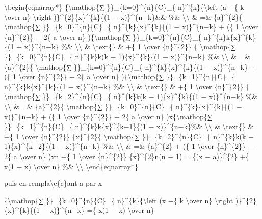 \documentclass[]{article}
\begin{document}
\textbackslash{}begin\{eqnarray*\} \{\textbackslash{}mathop\{∑
\}\}\_\{k=0\}\^{}\{n\}\{C\}\_\{ n\}\^{}\{k\}\{\textbackslash{}left (a
−\{ k \textbackslash{}over n\} \textbackslash{}right
)\}\^{}\{2\}\{x\}\^{}\{k\}\{(1 − x)\}\^{}\{n−k\}\&\& \%\&
\textbackslash{}\textbackslash{} \& =\& \{a\}\^{}\{2\}\{
\textbackslash{}mathop\{∑ \}\}\_\{k=0\}\^{}\{n\}\{C\}\_\{
n\}\^{}\{k\}\{x\}\^{}\{k\}\{(1 − x)\}\^{}\{n−k\} + (\{ 1
\textbackslash{}over \{n\}\^{}\{2\}\} − 2\{ a \textbackslash{}over n\}
)\{\textbackslash{}mathop\{∑ \}\}\_\{k=0\}\^{}\{n\}\{C\}\_\{
n\}\^{}\{k\}k\{x\}\^{}\{k\}\{(1 − x)\}\^{}\{n−k\} \%\&
\textbackslash{}\textbackslash{} \& \textbackslash{}text\{\} \& +\{ 1
\textbackslash{}over \{n\}\^{}\{2\}\} \{ \textbackslash{}mathop\{∑
\}\}\_\{k=0\}\^{}\{n\}\{C\}\_\{ n\}\^{}\{k\}k(k − 1)\{x\}\^{}\{k\}\{(1 −
x)\}\^{}\{n−k\} \%\& \textbackslash{}\textbackslash{} \& =\&
\{a\}\^{}\{2\}\{ \textbackslash{}mathop\{∑
\}\}\_\{k=0\}\^{}\{n\}\{C\}\_\{ n\}\^{}\{k\}\{x\}\^{}\{k\}\{(1 −
x)\}\^{}\{n−k\} + (\{ 1 \textbackslash{}over \{n\}\^{}\{2\}\} − 2\{ a
\textbackslash{}over n\} )\{\textbackslash{}mathop\{∑
\}\}\_\{k=1\}\^{}\{n\}\{C\}\_\{ n\}\^{}\{k\}k\{x\}\^{}\{k\}\{(1 −
x)\}\^{}\{n−k\} \%\& \textbackslash{}\textbackslash{} \&
\textbackslash{}text\{\} \& +\{ 1 \textbackslash{}over \{n\}\^{}\{2\}\}
\{ \textbackslash{}mathop\{∑ \}\}\_\{k=2\}\^{}\{n\}\{C\}\_\{
n\}\^{}\{k\}k(k − 1)\{x\}\^{}\{k\}\{(1 − x)\}\^{}\{n−k\} \%\&
\textbackslash{}\textbackslash{} \& =\& \{a\}\^{}\{2\}\{
\textbackslash{}mathop\{∑ \}\}\_\{k=0\}\^{}\{n\}\{C\}\_\{
n\}\^{}\{k\}\{x\}\^{}\{k\}\{(1 − x)\}\^{}\{n−k\} + (\{ 1
\textbackslash{}over \{n\}\^{}\{2\}\} − 2\{ a \textbackslash{}over n\}
)x\{\textbackslash{}mathop\{∑ \}\}\_\{k=1\}\^{}\{n\}\{C\}\_\{
n\}\^{}\{k\}k\{x\}\^{}\{k−1\}\{(1 − x)\}\^{}\{n−k\}\%\&
\textbackslash{}\textbackslash{} \& \textbackslash{}text\{\} \& +\{ 1
\textbackslash{}over \{n\}\^{}\{2\}\} \{x\}\^{}\{2\}\{
\textbackslash{}mathop\{∑ \}\}\_\{k=2\}\^{}\{n\}\{C\}\_\{
n\}\^{}\{k\}k(k − 1)\{x\}\^{}\{k−2\}\{(1 − x)\}\^{}\{n−k\} \%\&
\textbackslash{}\textbackslash{} \& =\& \{a\}\^{}\{2\} + (\{ 1
\textbackslash{}over \{n\}\^{}\{2\}\} − 2\{ a \textbackslash{}over n\}
)xn +\{ 1 \textbackslash{}over \{n\}\^{}\{2\}\} \{x\}\^{}\{2\}n(n − 1) =
\{(x − a)\}\^{}\{2\} +\{ x(1 − x) \textbackslash{}over n\} \%\&
\textbackslash{}\textbackslash{} \textbackslash{}end\{eqnarray*\}

puis en rempla\textbackslash{}c\{c\}ant a par x

\{\textbackslash{}mathop\{∑ \}\}\_\{k=0\}\^{}\{n\}\{C\}\_\{
n\}\^{}\{k\}\{\textbackslash{}left (x −\{ k \textbackslash{}over n\}
\textbackslash{}right )\}\^{}\{2\}\{x\}\^{}\{k\}\{(1 − x)\}\^{}\{n−k\}
=\{ x(1 − x) \textbackslash{}over n\}
\end{document}
